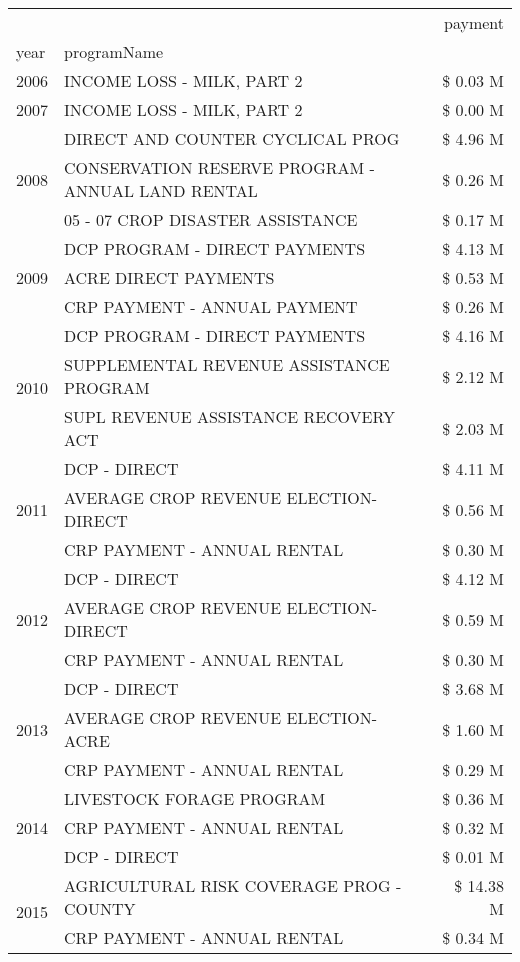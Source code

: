 \begin{tabular}{llr}
\toprule
 &  & payment \\
year & programName &  \\
\midrule
2006 & INCOME LOSS - MILK, PART 2 & \$ 0.03 M \\
\cline{1-3}
2007 & INCOME LOSS - MILK, PART 2 & \$ 0.00 M \\
\cline{1-3}
\multirow[t]{3}{*}{2008} & DIRECT AND COUNTER CYCLICAL PROG & \$ 4.96 M \\
 & CONSERVATION RESERVE PROGRAM - ANNUAL LAND RENTAL & \$ 0.26 M \\
 & 05 - 07 CROP DISASTER ASSISTANCE & \$ 0.17 M \\
\cline{1-3}
\multirow[t]{3}{*}{2009} & DCP PROGRAM - DIRECT PAYMENTS & \$ 4.13 M \\
 & ACRE DIRECT PAYMENTS & \$ 0.53 M \\
 & CRP PAYMENT - ANNUAL PAYMENT & \$ 0.26 M \\
\cline{1-3}
\multirow[t]{3}{*}{2010} & DCP PROGRAM - DIRECT PAYMENTS & \$ 4.16 M \\
 & SUPPLEMENTAL REVENUE ASSISTANCE PROGRAM & \$ 2.12 M \\
 & SUPL REVENUE ASSISTANCE RECOVERY ACT & \$ 2.03 M \\
\cline{1-3}
\multirow[t]{3}{*}{2011} & DCP - DIRECT & \$ 4.11 M \\
 & AVERAGE CROP REVENUE ELECTION-DIRECT & \$ 0.56 M \\
 & CRP PAYMENT - ANNUAL RENTAL & \$ 0.30 M \\
\cline{1-3}
\multirow[t]{3}{*}{2012} & DCP - DIRECT & \$ 4.12 M \\
 & AVERAGE CROP REVENUE ELECTION-DIRECT & \$ 0.59 M \\
 & CRP PAYMENT - ANNUAL RENTAL & \$ 0.30 M \\
\cline{1-3}
\multirow[t]{3}{*}{2013} & DCP - DIRECT & \$ 3.68 M \\
 & AVERAGE CROP REVENUE ELECTION-ACRE & \$ 1.60 M \\
 & CRP PAYMENT - ANNUAL RENTAL & \$ 0.29 M \\
\cline{1-3}
\multirow[t]{3}{*}{2014} & LIVESTOCK FORAGE PROGRAM & \$ 0.36 M \\
 & CRP PAYMENT - ANNUAL RENTAL & \$ 0.32 M \\
 & DCP - DIRECT & \$ 0.01 M \\
\cline{1-3}
\multirow[t]{3}{*}{2015} & AGRICULTURAL RISK COVERAGE PROG - COUNTY & \$ 14.38 M \\
 & CRP PAYMENT - ANNUAL RENTAL & \$ 0.34 M \\

\end{tabular}
